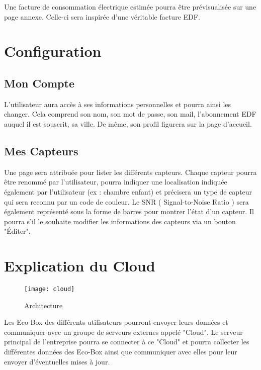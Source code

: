 \documentclass[10pt,a4paper]{article}
\begin{document}
Une facture de consommation électrique estimée pourra être prévisualisée sur une page annexe. Celle-ci sera inspirée d'une véritable facture EDF.

\section{Configuration}

\subsection{Mon Compte}%

L'utilisateur aura accès à ses informations personnelles et pourra ainsi les changer. Cela comprend son nom, son mot de passe, son mail, l'abonnement EDF auquel il est souscrit, sa ville. De même, son profil figurera sur la page d'accueil.

\subsection{Mes Capteurs}%

Une page sera attribuée pour lister les différents capteurs. Chaque capteur pourra être renommé par l'utilisateur, pourra indiquer une localisation indiquée également par l'utilisateur (ex : chambre enfant) et précisera un type de capteur qui sera reconnu par un code de couleur. Le SNR ( Signal-to-Noise Ratio ) sera également représenté sous la forme de barres pour montrer l'état d'un capteur. Il pourra s'il le souhaite modifier les informations des capteurs via un bouton "Éditer".

\section{Explication du Cloud}

    \begin{figure}[h]
    \centering
    \texttt{[image: cloud]}
    \caption{Architecture}
    \label{fig:p2_1_vlc_vod}
    \end{figure}

Les Eco-Box des différents utilisateurs pourront envoyer leurs données et communiquer avec un groupe de serveurs externes appelé "Cloud". Le serveur principal de l'entreprise pourra se connecter à ce "Cloud" et pourra collecter les différentes données des Eco-Box ainsi que communiquer avec elles pour leur envoyer d'éventuelles mises à jour.
\end{document}
